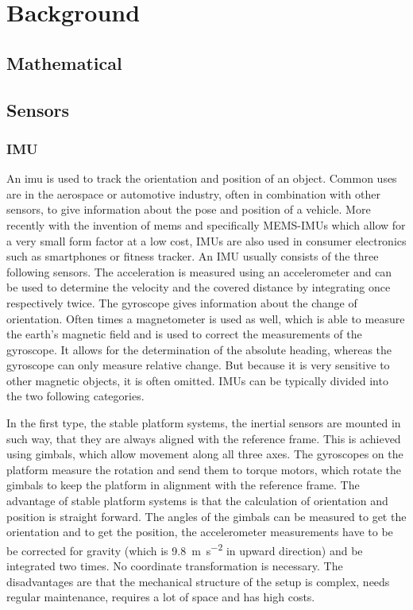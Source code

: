 \chapter{Background}
\label{ch:Background}
\section{Mathematical}

\section{Sensors}
\subsection{IMU}
An \gls{imu} is used to track the orientation and position of an object. 
Common uses are in the aerospace or automotive industry, often in combination with other sensors, to give information about the pose and position of a vehicle. 
More recently with the invention of \gls{mems} and specifically MEMS-IMUs which allow for a very small form factor at a low cost, IMUs are also used in consumer electronics such as smartphones or fitness tracker. 
An IMU usually consists of the three following sensors.
The acceleration is measured using an accelerometer and can be used to determine the velocity and the covered distance by integrating once respectively twice.
The gyroscope gives information about the change of orientation. 
Often times a magnetometer is used as well, which is able to measure the earth's magnetic field and is used to correct the measurements of the gyroscope.
It allows for the determination of the absolute heading, whereas the gyroscope can only measure relative change. But because it is very sensitive to other magnetic objects, it is often omitted.
IMUs can be typically divided into the two following categories.

In the first type, the stable platform systems, the inertial sensors are mounted in such way, that they are always aligned with the reference frame.
This is achieved using gimbals, which allow movement along all three axes. 
The gyroscopes on the platform measure the rotation and send them to torque motors, which rotate the gimbals to keep the platform in alignment with the reference frame. 
The advantage of stable platform systems is that the calculation of orientation and position is straight forward. 
The angles of the gimbals can be measured to get the orientation and to get the position, the accelerometer measurements have to be be corrected for gravity (which is \SI{9.8}{\metre\per\second^2} in upward direction) and be integrated two times.
No coordinate transformation is necessary.
The disadvantages are that the mechanical structure of the setup is complex, needs regular maintenance, requires a lot of space and has high costs.

